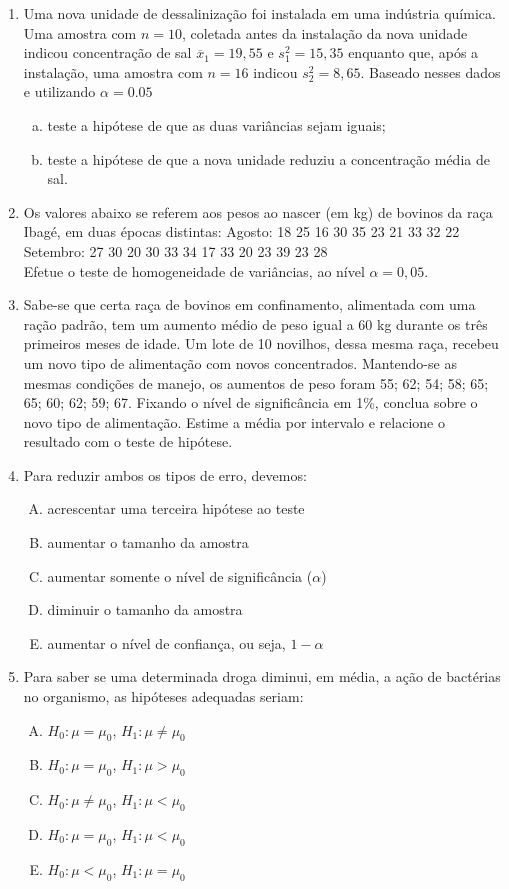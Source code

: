 \documentclass[12pt, a4paper]{article}
\begin{document}
\begin{enumerate}
\item Uma nova unidade de dessalinização foi instalada em uma indústria química. Uma amostra com $n=10$, coletada antes da instalação da nova unidade indicou concentração de sal $\overline{x}_{1}=19,55$ e $s_{1}^{2}=15,35$ enquanto que, após a instalação, uma amostra com $n=16$ indicou $s_{2}^{2}=8,65$. Baseado nesses dados e utilizando $\alpha=0.05$
\begin{enumerate}[a)]
    \item teste a hipótese de que as duas variâncias sejam iguais;
    \item teste a hipótese de que a nova unidade reduziu a concentração média de sal.
\end{enumerate}

\item Os valores abaixo se referem aos pesos ao nascer (em kg) de bovinos da raça Ibagé, em duas épocas distintas:
Agosto: 18 25 16 30 35 23 21 33 32 22\\
Setembro: 27 30 20 30 33 34 17 33 20 23 39 23 28\\
Efetue o teste de homogeneidade de variâncias, ao nível $\alpha=0,05$.

\item Sabe-se que certa raça de bovinos em confinamento, alimentada com uma ração padrão, tem um aumento médio de peso igual a 60 kg durante os três primeiros meses de idade. Um lote de 10 novilhos, dessa mesma raça, recebeu um novo tipo de alimentação com novos concentrados. Mantendo-se as mesmas condições de manejo, os aumentos de peso foram 55; 62; 54; 58; 65; 65; 60; 62; 59; 67. Fixando o nível de significância em 1\%, conclua sobre o novo tipo de alimentação. Estime a média por intervalo e relacione o resultado com o teste de hipótese.

\item Para reduzir ambos os tipos de erro, devemos:
\begin{enumerate}[A)]
    \item acrescentar uma terceira hipótese ao teste
    \item aumentar o tamanho da amostra
    \item aumentar somente o nível de significância ($\alpha$)
    \item diminuir o tamanho da amostra
    \item aumentar o nível de confiança, ou seja, $1-\alpha$
\end{enumerate}

\item Para saber se uma determinada droga diminui, em média, a ação de bactérias no organismo, as hipóteses adequadas seriam:
\begin{enumerate}[A)]
    \item $H_0: \mu=\mu_{0}$, $H_1: \mu \neq \mu_{0}$
    \item $H_0: \mu=\mu_{0}$, $H_1: \mu > \mu_{0}$
    \item $H_0: \mu \neq \mu_{0}$, $H_1: \mu < \mu_{0}$
    \item $H_0: \mu=\mu_{0}$, $H_1: \mu < \mu_{0}$
    \item $H_0: \mu < \mu_{0}$, $H_1: \mu = \mu_{0}$
\end{enumerate}


\end{enumerate}
\end{document}
